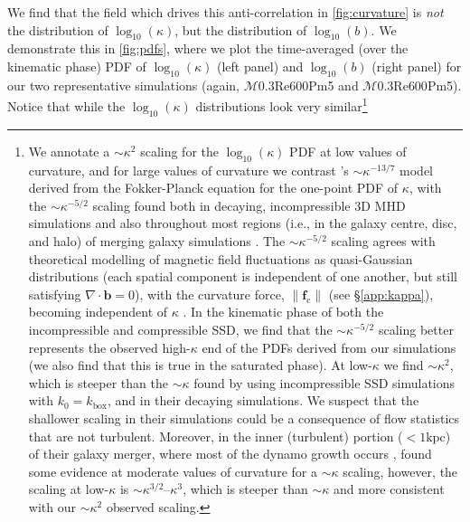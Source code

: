 \documentclass[12pt,twoside]{extreport}
\makeatletter
\newcommand{\mVector}[1]{\bm{#1}} %
\newcommand{\mReh}{\ensuremath{\mathrm{Re}}} %
\newcommand{\mPrm}{\ensuremath{\mathrm{Pm}}} %
\newcommand{\mSonicMach}{\ensuremath{\mathcal{M}}} %
\newcommand{\ie}{i.e.,\xspace} %
\newcommand{\eg}{e.g.,\xspace} %
\newcommand{\SimName}[3]{$\mSonicMach${#1}$\mReh${#2}$\mPrm${#3}}
\providecommand{\DIFaddtex}[1]{{\protect\color{DIFgreen}\uwave{#1}}} %
\providecommand{\DIFdeltex}[1]{{\protect\color{DIFpurple}\sout{#1}}} %
\providecommand{\DIFaddbegin}{} %
\providecommand{\DIFaddend}{} %
\providecommand{\DIFdelbegin}{} %
\providecommand{\DIFdelend}{} %
\providecommand{\DIFadd}[1]{\texorpdfstring{\DIFaddtex{#1}}{#1}} %
\providecommand{\DIFdel}[1]{\texorpdfstring{\DIFdeltex{#1}}{}} %
\providecommand{\DIFscaledelfig}{0.5}
\newlength{\DIFdelgraphicswidth} %
\newlength{\DIFdelgraphicsheight} %
\providecommand{\DIFaddincludegraphics}[2][]{{\color{DIFgreen}\fbox{\DIFOincludegraphics[#1]{#2}}}} %
\providecommand{\DIFdelincludegraphics}[2][]{%
\sbox{\DIFdelgraphicsbox}{\DIFOincludegraphics[#1]{#2}}%
\settoboxwidth{\DIFdelgraphicswidth}{\DIFdelgraphicsbox} %
\settoboxtotalheight{\DIFdelgraphicsheight}{\DIFdelgraphicsbox} %
\scalebox{\DIFscaledelfig}{%
\parbox[b]{\DIFdelgraphicswidth}{\usebox{\DIFdelgraphicsbox}\\[-\baselineskip] \rule{\DIFdelgraphicswidth}{0em}}\llap{\resizebox{\DIFdelgraphicswidth}{\DIFdelgraphicsheight}{%
\setlength{\unitlength}{\DIFdelgraphicswidth}%
\begin{picture}(1,1)%
\thicklines\linethickness{2pt} %
{\color{DIFpurple}\put(0,0){\framebox(1,1){}}}%
{\color{DIFpurple}\put(0,0){\line( 1,1){1}}}%
{\color{DIFpurple}\put(0,1){\line(1,-1){1}}}%
\end{picture}%
}\hspace*{3pt}}} %
} %
\DeclareRobustCommand{\DIFaddbegin}{\DIFOaddbegin \let\includegraphics\DIFaddincludegraphics} %
\DeclareRobustCommand{\DIFaddend}{\DIFOaddend \let\includegraphics\DIFOincludegraphics} %
\DeclareRobustCommand{\DIFdelbegin}{\DIFOdelbegin \let\includegraphics\DIFdelincludegraphics} %
\DeclareRobustCommand{\DIFdelend}{\DIFOaddend \let\includegraphics\DIFOincludegraphics} %
\let\sout@orig\sout %
\renewcommand{\sout}[1]{\ifmmode\text{\sout@orig{\ensuremath{#1}}}\else\sout@orig{#1}\fi} %
\makeatother
\begin{document}
We find that the field which drives this anti-correlation in \autoref{fig:curvature} is \textit{not} the distribution of $\log_{10}(\kappa)$, but the distribution of $\log_{10}(b)$. We demonstrate this in \autoref{fig:pdfs}, where we plot the time-averaged (over the kinematic phase) PDF of $\log_{10}(\kappa)$ (left panel) and $\log_{10}(b)$ (right panel) for our two representative simulations (again, \SimName{0.3}{600}{5} and \SimName{0.3}{600}{5}). Notice that while the $\log_{10}(\kappa)$ distributions look very similar\footnote{
    We annotate a $\sim \kappa^2$ scaling for the $\log_{10}(\kappa)$ PDF at low values of curvature, and for large values of curvature we contrast \citet{schekochihin2002small}'s \mbox{$\sim \kappa^{-13/7}$} model derived from the Fokker-Planck equation for the one-point PDF of $\kappa$, with the \mbox{$\sim \kappa^{-5/2}$} scaling found both in decaying, incompressible 3D MHD simulations \citep{yang2019role} and also throughout most regions (\ie in the galaxy centre, disc, and halo) of merging galaxy simulations \citep{pfrommer2022simulating}. The $\sim \kappa^{-5/2}$ scaling agrees with theoretical modelling of magnetic field fluctuations as quasi-Gaussian distributions (each spatial component is independent of one another, but still satisfying $\nabla\cdot\mVector{b} = 0$), with the curvature force, $\|\mVector{f}_\mathrm{c}\|$ (see \S\ref{app:kappa}), becoming independent of $\kappa$ \citep{yang2019role, pfrommer2022simulating}. In the kinematic phase of both the incompressible and compressible SSD, we find that the $\sim \kappa^{-5/2}$ scaling better represents the observed high-$\kappa$ end of the PDFs derived from our simulations (we also find that this is true in the saturated phase). At low-$\kappa$ we find $\sim \kappa^2$, which is steeper than the $\sim \kappa$ found by \citet{schekochihin2002small} using incompressible SSD simulations with \DIFdelbegin \DIFdel{$k_0 = k_\mathrm{box}$}\DIFdelend \DIFaddbegin \DIFadd{$k_\mathrm{turb} = k_\mathrm{box}$}\DIFaddend , and \citet{yang2019role} in their decaying simulations. We suspect that the shallower scaling in their simulations could be a consequence of flow statistics that are not turbulent. Moreover, in the inner (turbulent) portion ($< 1 \mathrm{kpc}$) of their galaxy merger, where most of the dynamo growth occurs \citep[\eg][]{whittingham2021impact}, \citet{pfrommer2022simulating} found some evidence at moderate values of curvature for a $\sim \kappa$ scaling, however, the scaling at low-$\kappa$ is $\sim \kappa^{3/2}$--$\kappa^3$, which is steeper than $\sim \kappa$ and more consistent with our $\sim \kappa^2$ observed scaling.
}
\end{document}
